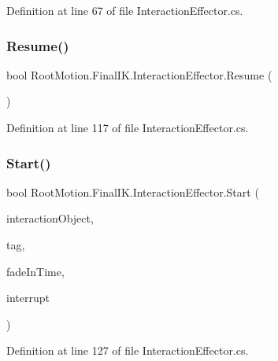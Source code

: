 Definition at line 67 of file Interaction\+Effector.\+cs.

\mbox{\label{class_root_motion_1_1_final_i_k_1_1_interaction_effector_a474e0c3490add3ab446305df0ee8ce1f}} 
\subsubsection{\texorpdfstring{Resume()}{Resume()}}
{\footnotesize\ttfamily bool Root\+Motion.\+Final\+I\+K.\+Interaction\+Effector.\+Resume (\begin{DoxyParamCaption}{ }\end{DoxyParamCaption})}



Definition at line 117 of file Interaction\+Effector.\+cs.

\mbox{\label{class_root_motion_1_1_final_i_k_1_1_interaction_effector_a7ec2ff0c84091865de67d02a2901cc21}} 
\subsubsection{\texorpdfstring{Start()}{Start()}}
{\footnotesize\ttfamily bool Root\+Motion.\+Final\+I\+K.\+Interaction\+Effector.\+Start (\begin{DoxyParamCaption}\item[{\mbox{\hyperlink{class_root_motion_1_1_final_i_k_1_1_interaction_object}{Interaction\+Object}}}]{interaction\+Object,  }\item[{string}]{tag,  }\item[{float}]{fade\+In\+Time,  }\item[{bool}]{interrupt }\end{DoxyParamCaption})}



Definition at line 127 of file Interaction\+Effector.\+cs.

